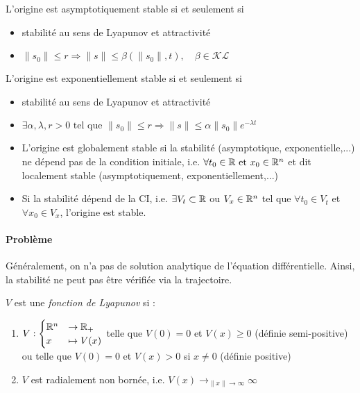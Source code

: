 \documentclass[main.tex]{subfiles} \newcommand{\D}{\mathcal{D}}
\newcommand{\Kc}{\mathcal{K}} \newcommand{\Lc}{\mathcal{L}}
\begin{document}
\begin{prop} L'origine est asymptotiquement stable si
et seulement si \begin{itemize} \item stabilité au sens de Lyapunov et
		attractivité \item $\|s_0\| \leq r \Rightarrow \|s\| \leq \beta
			(\|s_0\|,t), \quad \beta \in \Kc\Lc$ \end{itemize} \end{prop}

\begin{prop} L'origine est exponentiellement stable si
et seulement si \begin{itemize} \item stabilité au sens de Lyapunov et
		attractivité \item $\exists \alpha, \lambda, r >0 \text{ tel que }
			\|s_0\| \leq r \Rightarrow \|s\| \leq \alpha \|s_0\| e^{-\lambda
			t}$ \end{itemize} \end{prop} \begin{prop} \begin{itemize} \item L'origine est globalement stable
							si la stabilité (asymptotique, exponentielle,...)
							ne dépend pas de la condition initiale, i.e.
							$\forall t_0 \in \mathbb{R} \text{ et } x_0 \in \mathbb{R}^n$ et
							dit localement stable (asymptotiquement,
							exponentiellement,...) \item Si la stabilité dépend
				de la CI, i.e. $\exists V_t \subset \mathbb{R}$ ou $V_x \in \mathbb{R}^n$ tel
				que $\forall t_0 \in V_t$ et $\forall x_0 \in V_x$, l'origine
				est stable.  \end{itemize} \end{prop} \paragraph{Problème}
				Généralement, on n'a pas de solution analytique de l'équation
				différentielle. Ainsi, la stabilité ne peut pas être vérifiée
				via la trajectoire.

\begin{defin} $V$ est une \emph{fonction de Lyapunov} si : \begin{enumerate}
	\item $V : \begin{cases} \mathbb{R}^n & \rightarrow \mathbb{R}_+\\x & \mapsto V(x)
	\end{cases} $ telle que $V(0)=0$ et $V(x) \geq 0$ (définie semi-positive)
		ou telle que $V(0)=0$ et $V(x) > 0$ si $x\neq 0$ (définie positive)
\item $V$ est radialement non bornée, i.e. $V(x) \rightarrow_{\|x\| \rightarrow
\infty} \infty$ \end{enumerate} \end{defin}
\end{document}
